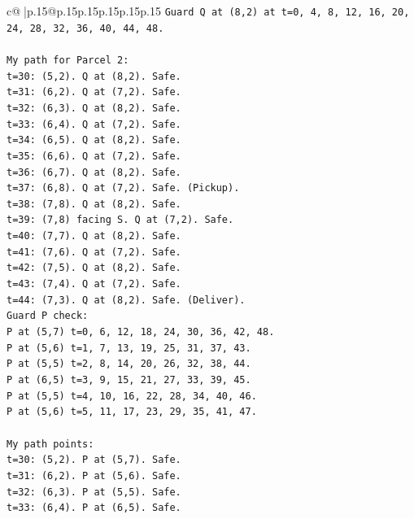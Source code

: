 \documentclass{article}
\begin{document}
{\begin{supertabular}{c@{$\;$}|p{.15\linewidth}@{}p{.15\linewidth}p{.15\linewidth}p{.15\linewidth}p{.15\linewidth}p{.15\linewidth}}
{{{\texttt{Guard Q at (8,2) at t=0, 4, 8, 12, 16, 20, 24, 28, 32, 36, 40, 44, 48.} \\
\\ 
\texttt{My path for Parcel 2:} \\
\texttt{t=30: (5,2). Q at (8,2). Safe.} \\
\texttt{t=31: (6,2). Q at (7,2). Safe.} \\
\texttt{t=32: (6,3). Q at (8,2). Safe.} \\
\texttt{t=33: (6,4). Q at (7,2). Safe.} \\
\texttt{t=34: (6,5). Q at (8,2). Safe.} \\
\texttt{t=35: (6,6). Q at (7,2). Safe.} \\
\texttt{t=36: (6,7). Q at (8,2). Safe.} \\
\texttt{t=37: (6,8). Q at (7,2). Safe. (Pickup).} \\
\texttt{t=38: (7,8). Q at (8,2). Safe.} \\
\texttt{t=39: (7,8) facing S. Q at (7,2). Safe.} \\
\texttt{t=40: (7,7). Q at (8,2). Safe.} \\
\texttt{t=41: (7,6). Q at (7,2). Safe.} \\
\texttt{t=42: (7,5). Q at (8,2). Safe.} \\
\texttt{t=43: (7,4). Q at (7,2). Safe.} \\
\texttt{t=44: (7,3). Q at (8,2). Safe. (Deliver).} \\
\texttt{Guard P check:} \\
\texttt{P at (5,7) t=0, 6, 12, 18, 24, 30, 36, 42, 48.} \\
\texttt{P at (5,6) t=1, 7, 13, 19, 25, 31, 37, 43.} \\
\texttt{P at (5,5) t=2, 8, 14, 20, 26, 32, 38, 44.} \\
\texttt{P at (6,5) t=3, 9, 15, 21, 27, 33, 39, 45.} \\
\texttt{P at (5,5) t=4, 10, 16, 22, 28, 34, 40, 46.} \\
\texttt{P at (5,6) t=5, 11, 17, 23, 29, 35, 41, 47.} \\
\\ 
\texttt{My path points:} \\
\texttt{t=30: (5,2). P at (5,7). Safe.} \\
\texttt{t=31: (6,2). P at (5,6). Safe.} \\
\texttt{t=32: (6,3). P at (5,5). Safe.} \\
\texttt{t=33: (6,4). P at (6,5). Safe.} \\
}}}
\end{supertabular}}
\end{document}
